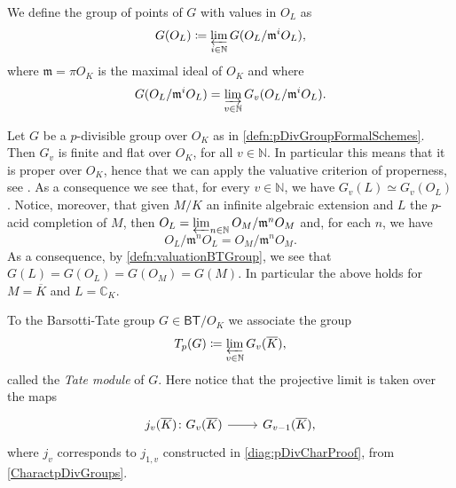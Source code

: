 \begin{defn}[]\label{defn:valuationBTGroup}
	We define the group of points of $G$ with values in $O_L$ as
	\begin{equation*}
		G(O_L) \coloneqq \varprojlim_{i \in \mathbb{N}} G(O_L/\mathfrak{m}^iO_L)
	,\end{equation*}
	where $\mathfrak{m} = \pi O_K$ is the maximal ideal of $O_K$ and where
	\begin{equation*}
		G(O_L/\mathfrak{m}^iO_L) = \varinjlim_{v \in \mathbb{N}} G_v(O_L/\mathfrak{m}^iO_L)
	.\end{equation*}
\end{defn}


\begin{rem}[]\label{VCPBTGroups}
	Let $G$ be a $p$-divisible group over $O_K$ as in \cref{defn:pDivGroupFormalSchemes}.
	Then $G_v$ is finite and flat over $O_K$, for all $v \in \mathbb{N}$. 
	In particular this means that it is proper over $O_K$, hence
	that we can apply the valuative criterion of properness,
	see \cite[Chapter II, theorem 4.7]{Hartshorne}.
	As a consequence we see that, for every $v \in \mathbb{N}$, we have
	$G_v(L) \simeq G_v(O_L)$.
	Notice, moreover, that given $M/K$ an infinite algebraic extension
	and $L$ the $p$-acid completion of $M$, then
	$O_L = \varprojlim_{n \in \mathbb{N}}O_M/\mathfrak{m}^nO_M$
	and, for each $n$, we have
	\begin{equation*}
	O_L/\mathfrak{m}^nO_L = O_M/\mathfrak{m}^nO_M
	.\end{equation*}
	As a consequence, by \cref{defn:valuationBTGroup}, we see that
	$G(L) = G(O_L) = G(O_M) = G(M)$.
	In particular the above holds for $M = \overline{K}$ and $L = \mathbb{C}_K$.
\end{rem}


\begin{defn}
	To the Barsotti-Tate group $G \in \mathsf{BT}/O_K$ we associate the group
	\begin{equation*}
		T_p(G) \coloneqq \varprojlim_{v \in \mathbb{N}} G_v(\overline{K})
	,\end{equation*}
	called the \emph{Tate module} of $G$.
	Here notice that the projective limit is taken over the maps
	\begin{equation*}
	\begin{tikzcd}[row sep = 0ex
		,/tikz/column 1/.append style={anchor=base east}
		,/tikz/column 2/.append style={anchor=base west}]
		j_v(\overline{K})\colon 
		G_v(\overline{K})\arrow[r, "", rightarrow] &
		G_{v-1}(\overline{K})
	,\end{tikzcd}
	\end{equation*} 
	where $j_v$ corresponds to $j_{1,v}$ constructed in
	\cref{diag:pDivCharProof}, from \cref{CharactpDivGroups}.
\end{defn}


